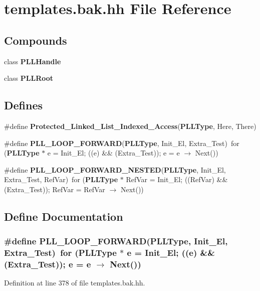 \section{templates.bak.hh File Reference}
\label{templates_8bak_8hh}
\subsection*{Compounds}
\begin{CompactItemize}
\item 
class {\bf PLLHandle}
\item 
class {\bf PLLRoot}
\end{CompactItemize}
\subsection*{Defines}
\begin{CompactItemize}
\item 
\#define {\bf Protected\_\-Linked\_\-List\_\-Indexed\_\-Access}({\bf PLLType}, Here, There)
\item 
\#define {\bf PLL\_\-LOOP\_\-FORWARD}({\bf PLLType}, Init\_\-El, Extra\_\-Test)\ for ({\bf PLLType} $\ast$ e = Init\_\-El; ((e) \&\& (Extra\_\-Test)); e = e $\rightarrow$ Next())
\item 
\#define {\bf PLL\_\-LOOP\_\-FORWARD\_\-NESTED}({\bf PLLType}, Init\_\-El, Extra\_\-Test, Ref\-Var)\ for ({\bf PLLType} $\ast$ Ref\-Var = Init\_\-El; ((Ref\-Var) \&\& (Extra\_\-Test)); Ref\-Var = Ref\-Var $\rightarrow$ Next())
\end{CompactItemize}


\subsection{Define Documentation}
\subsubsection{\setlength{\rightskip}{0pt plus 5cm}\#define PLL\_\-LOOP\_\-FORWARD({\bf PLLType}, Init\_\-El, Extra\_\-Test)\ for ({\bf PLLType} $\ast$ e = Init\_\-El; ((e) \&\& (Extra\_\-Test)); e = e $\rightarrow$ Next())}\label{templates_8bak_8hh_a1}




Definition at line 378 of file templates.bak.hh.


